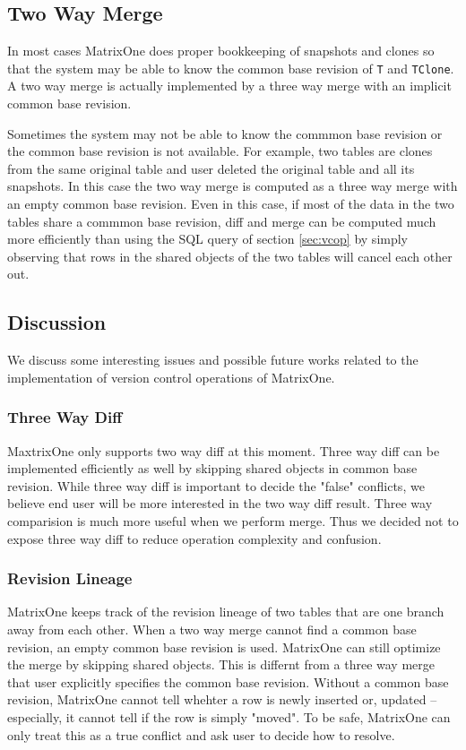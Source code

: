 \documentclass[sigconf,nonacm]{acmart} %
\begin{document}
\subsection{Two Way Merge}
In most cases MatrixOne does proper bookkeeping of snapshots and clones so that 
the system may be able to know the common base revision of \texttt{T} 
and \texttt{TClone}.  A two way merge is actually implemented by a three way 
merge with an implicit common base revision.

Sometimes the system may not be able to know the commmon base revision or 
the common base revision is not available.  For example, two tables are clones 
from the same original table and user deleted the original table and 
all its snapshots.  In this case the two way merge is computed as a three way
merge with an empty common base revision.  Even in this case, if most of the 
data in the two tables share a commmon base revision, diff and merge 
can be computed much more efficiently than using the SQL query of 
section \ref{sec:vcop} by simply observing that rows in the shared objects 
of the two tables will cancel each other out.

\subsection{Discussion}
We discuss some interesting issues and possible future works related to 
the implementation of version control operations of MatrixOne.

\subsubsection{Three Way Diff}
MaxtrixOne only supports two way diff at this moment.  Three way diff can
be implemented efficiently as well by skipping shared objects in common 
base revision.
While three way diff is important to decide the "false" conflicts, we believe end 
user will be more interested in the two way diff result.  Three way 
comparision is much more useful when we perform merge.  Thus we decided
not to expose three way diff to reduce operation complexity and confusion.

\subsubsection{Revision Lineage}
MatrixOne keeps track of the revision lineage of two tables that are one 
branch away from each other.  When a two way merge cannot find a common 
base revision, an empty common base revision is used.  MatrixOne can 
still optimize the merge by skipping shared objects.  This is differnt 
from a three way merge that user explicitly specifies the common base revision.
Without a common base revision, MatrixOne cannot tell whehter a row is newly 
inserted or, updated -- especially, it cannot tell if the row is simply "moved".
To be safe, MatrixOne can only treat this as a true conflict and ask 
user to decide how to resolve.
\end{document}
